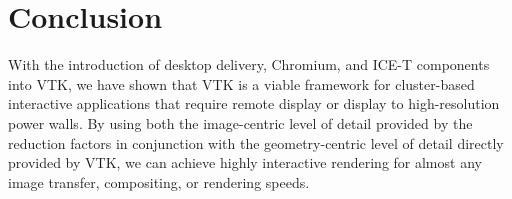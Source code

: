 \documentclass{acmsiggraph}
\newcommand{\sticky}[1]{}
\newcommand{\cidentifier}[1]{\texttt{#1}}
\begin{document}
  \section{Conclusion}
  \label{sec:conclusion}

  With the introduction of desktop delivery, Chromium, and ICE-T components
  into VTK, we have shown that VTK is a viable framework for cluster-based
  interactive applications that require remote display or display to
  high-resolution power walls.  By using both the image-centric level of
  detail provided by the reduction factors in conjunction with the
  geometry-centric level of detail directly provided by VTK, we can achieve
  highly interactive rendering for almost any image transfer, compositing,
  or rendering speeds.  \sticky{Some empirical evidence, i.e. with LLNL
  data, would probably be good here.  But how?  You really need a video and
  see it in action.}


\end{document}
